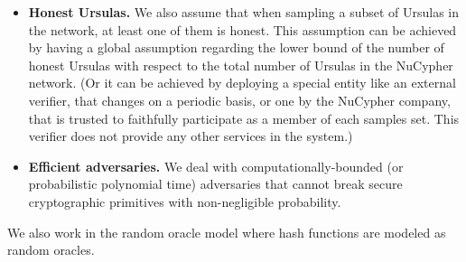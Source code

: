 \begin{itemize}
\item {\bf Honest Ursulas.} We also assume that when sampling a subset of Ursulas in the network, at least one of them is honest. This assumption can be achieved by having a global assumption regarding the lower bound of the number of honest Ursulas with respect to the total number of Ursulas in the NuCypher network. (Or it can be achieved by deploying a special entity like an external verifier, that changes on a periodic basis, or one by the NuCypher company, that is trusted to faithfully participate as a member of each samples set. This verifier does not provide any other services in the system.)


\item {\bf Efficient adversaries.} We deal with computationally-bounded (or probabilistic polynomial time) adversaries that cannot break secure cryptographic primitives with non-negligible probability.
\end{itemize}


We also work in the random oracle model where hash functions are modeled as random oracles.



